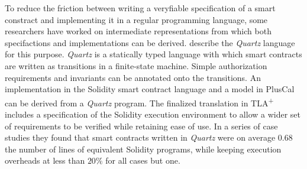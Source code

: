 \documentclass[english, biblatex, digitaloutput]{kththesis}
\begin{document}
To reduce the friction between writing a veryfiable specification of a smart constract and implementing it in a regular programming language, some researchers have worked on intermediate representations from which both specifactions and implementations can be derived. \textcite{kolb_quartz_2020} describe the \textit{Quartz} language for this purpose. \textit{Quartz} is a statically typed language with which smart contracts are written as transitions in a finite-state machine. Simple authorization requirements and invariants can be annotated onto the transitions. An implementation in the Solidity smart contract language and a model in PlusCal can be derived from a \textit{Quartz} program. The finalized translation in TLA\textsuperscript+ includes a specification of the Solidity execution environment to allow a wider set of requirements to be verified while retaining ease of use. In a series of case studies they found that smart contracts written in \textit{Quartz} were on average 0.68 the number of lines of equivalent Solidity programs, while keeping execution overheads at less than $20\%$ for all cases but one.







\end{document}

